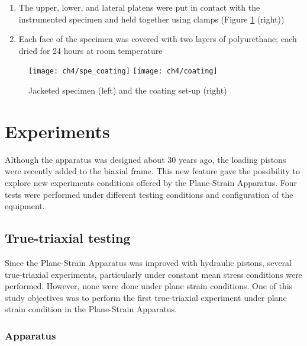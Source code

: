 \begin{enumerate}
    \item The upper, lower, and lateral platens were put in contact with the instrumented specimen and held together using clamps (Figure \ref{fig4:7} (right))
    \item Each face of the specimen was covered with two layers of polyurethane; each dried for 24 hours at room temperature
\end{enumerate}

\begin{figure}[tb]
    \centering
    \texttt{[image: ch4/spe\_coating]}
    \texttt{[image: ch4/coating]}
    \captionsetup{justification=centering}
    \caption{Jacketed specimen (left) and the coating set-up (right)}
    \label{fig4:7}
\end{figure} 

\section{Experiments} \label{ch4:exp}

Although the apparatus was designed about 30 years ago, the loading pistons were recently added to the biaxial frame. This new feature gave the possibility to explore new experiments conditions offered by the Plane-Strain Apparatus. Four tests were performed under different testing conditions and configuration of the equipment. 

\subsection{True-triaxial testing }

Since the Plane-Strain Apparatus was improved with hydraulic pistons, several true-triaxial experiments, particularly under constant mean stress conditions were performed. However, none were done under plane strain conditions. One of this study objectives was to perform the first true-triaxial experiment under plane strain condition in the Plane-Strain Apparatus. 

\subsubsection{Apparatus}

